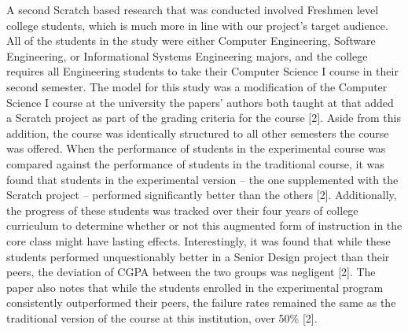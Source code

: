 A second Scratch based research that was conducted involved Freshmen level college 
students, which is much more in line with our project's target audience. All of the 
students in the study were either Computer Engineering, Software Engineering, or 
Informational Systems Engineering majors, and the college requires all Engineering 
students to take their Computer Science I course in their second semester. The model 
for this study was a modification of the Computer Science I course at the university 
the papers' authors both taught at that added a Scratch project as part of the grading 
criteria for the course [2]. Aside from this addition, the course was identically structured 
to all other semesters the course was offered. When the performance of students in 
the experimental course was compared against the performance of students in the 
traditional course, it was found that students in the experimental version -- the one 
supplemented with the Scratch project -- performed significantly better than the 
others [2]. Additionally, the progress of these students was tracked over their four 
years of college curriculum to determine whether or not this augmented form of 
instruction in the core class might have lasting effects. Interestingly, it was found that 
while these students performed unquestionably better in a Senior Design project than 
their peers, the deviation of CGPA between the two groups was negligent [2]. The 
paper also notes that while the students enrolled in the experimental program consistently
outperformed their peers, the failure rates remained the same as the traditional version of 
the course at this institution, over 50\% [2]. \\

